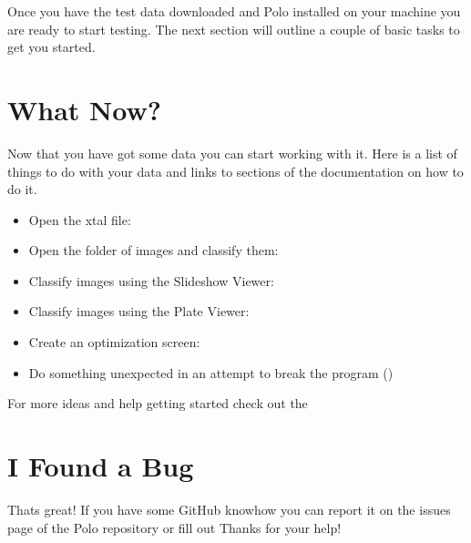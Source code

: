 \documentclass[letterpaper,10pt,english]{sphinxmanual}
\begin{document}
Once you have the test data downloaded and Polo installed on your machine
you are ready to start testing. The next section will outline a couple of
basic tasks to get you started.


\section{What Now?}
\label{\detokenize{beta_testers:what-now}}
Now that you have got some data you can start working with it. Here is a list
of things to do with your data and links to sections of the documentation
on how to do it.
\begin{itemize}
\item {} 
Open the xtal file: {\hyperref[\detokenize{user_guide:importing-images-from-a-directory}]{}}

\item {} 
Open the folder of images and classify them: {\hyperref[\detokenize{user_guide:importing-a-saved-run}]{}}

\item {} 
Classify images using the Slideshow Viewer: {\hyperref[\detokenize{user_guide:using-the-slideshow-view}]{}}

\item {} 
Classify images using the Plate Viewer: {\hyperref[\detokenize{user_guide:using-the-plate-viewer}]{}}

\item {} 
Create an optimization screen: {\hyperref[\detokenize{user_guide:using-the-optimize-tool}]{}}

\item {} 
Do something unexpected in an attempt to break the program ()

\end{itemize}

For more ideas and help getting started check out the {\hyperref[\detokenize{user_guide:user-s-guide}]{}}


\section{I Found a Bug}
\label{\detokenize{beta_testers:i-found-a-bug}}
Thats great! If you have some GitHub knowhow you can report it on the issues
page of the Polo repository or fill out 
Thanks for your help!
\end{document}
